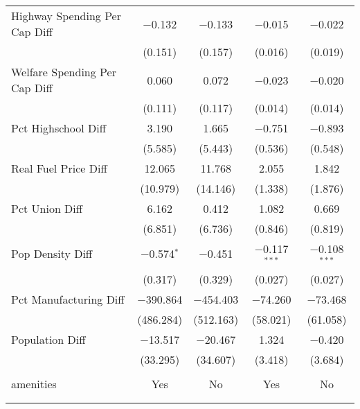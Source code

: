 \begin{table}[!htbp]
\begin{tabular}{@{\extracolsep{5pt}}lcccc}
  Highway Spending Per Cap Diff & $-$0.132 & $-$0.133 & $-$0.015 & $-$0.022 \\ 
  & (0.151) & (0.157) & (0.016) & (0.019) \\ 
  Welfare Spending Per Cap Diff & 0.060 & 0.072 & $-$0.023 & $-$0.020 \\ 
  & (0.111) & (0.117) & (0.014) & (0.014) \\ 
  Pct Highschool Diff & 3.190 & 1.665 & $-$0.751 & $-$0.893 \\ 
  & (5.585) & (5.443) & (0.536) & (0.548) \\ 
  Real Fuel Price Diff & 12.065 & 11.768 & 2.055 & 1.842 \\ 
  & (10.979) & (14.146) & (1.338) & (1.876) \\ 
  Pct Union Diff & 6.162 & 0.412 & 1.082 & 0.669 \\ 
  & (6.851) & (6.736) & (0.846) & (0.819) \\ 
  Pop Density Diff & $-$0.574$^{*}$ & $-$0.451 & $-$0.117$^{***}$ & $-$0.108$^{***}$ \\ 
  & (0.317) & (0.329) & (0.027) & (0.027) \\ 
  Pct Manufacturing Diff & $-$390.864 & $-$454.403 & $-$74.260 & $-$73.468 \\ 
  & (486.284) & (512.163) & (58.021) & (61.058) \\ 
  Population Diff & $-$13.517 & $-$20.467 & 1.324 & $-$0.420 \\ 
  & (33.295) & (34.607) & (3.418) & (3.684) \\ 
 \hline \\[-1.8ex] 
amenities & Yes & No & Yes & No \\ 
\hline \\[-1.8ex] 
\hline 
\hline \\[-1.8ex] 
\end{tabular} 
\end{table} 
